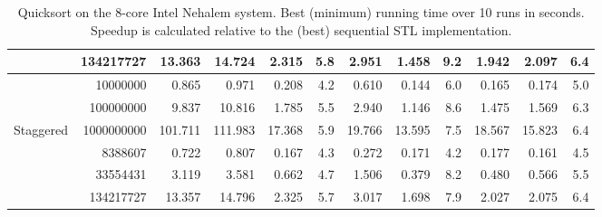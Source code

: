 \documentclass[preprint]{sigplanconf}
\begin{document}
\begin{table*}[t!]
\begin{center}
\begin{tabular}{|lr|rr|rrr|rrr||rr|}
 & 134217727 & 13.363 & 14.724 & 2.315 & 5.8 & 2.951 & 1.458 & 9.2 & 1.942 & 2.097 & 6.4 \\
\hline
 & 10000000 & 0.865 & 0.971 & 0.208 & 4.2 & 0.610 & 0.144 & 6.0 & 0.165 & 0.174 & 5.0 \\
 & 100000000 & 9.837 & 10.816 & 1.785 & 5.5 & 2.940 & 1.146 & 8.6 & 1.475 & 1.569 & 6.3 \\
Staggered & 1000000000 & 101.711 & 111.983 & 17.368 & 5.9 & 19.766 & 13.595 & 7.5 & 18.567 & 15.823 & 6.4 \\
 & 8388607 & 0.722 & 0.807 & 0.167 & 4.3 & 0.272 & 0.171 & 4.2 & 0.177 & 0.161 & 4.5 \\
 & 33554431 & 3.119 & 3.581 & 0.662 & 4.7 & 1.506 & 0.379 & 8.2 & 0.480 & 0.566 & 5.5 \\
 & 134217727 & 13.357 & 14.796 & 2.325 & 5.7 & 3.017 & 1.698 & 7.9 & 2.027 & 2.075 & 6.4 \\
\hline
\end{tabular}
\end{center}
\caption{Quicksort on the 8-core Intel Nehalem system. 
Best (minimum) running time over 10 runs in seconds.
Speedup is calculated relative to the (best) sequential STL implementation.}
\label{tab:sort_cora_min}
\end{table*}
\end{document}
